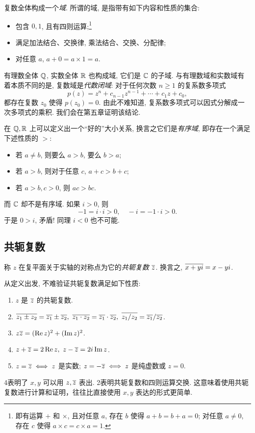 复数全体构成一个\emph{域}.
所谓的域, 是指带有如下内容和性质的集合:
\begin{itemize}
  \item 包含 $0,1$, 且有四则运算;\footnote{即有运算 $+$ 和 $\times$, 且对任意 $a$, 存在 $b$ 使得 $a+b=b+a=0$; 对任意 $a\neq 0$, 存在 $c$ 使得 $a\times c=c\times a=1$.}
  \item 满足加法结合、交换律, 乘法结合、交换、分配律;
  \item 对任意 $a$, $a+0=a\times 1=a$.
\end{itemize}
有理数全体 ${\mathbb{Q}}$, 实数全体 ${\mathbb{R}}$ 也构成域, 它们是 ${\mathbb{C}}$ 的子域.
与有理数域和实数域有着本质不同的是, 复数域是\emph{代数闭域}:
对于任何次数 $n\ge 1$ 的复系数多项式
  \[p(z)=z^n+c_{n-1}z^{n-1}+\cdots+c_1z+c_0,\]
都存在复数 $z_0$ 使得 $p(z_0)=0$.
由此不难知道, 复系数多项式可以因式分解成一次多项式的乘积.
我们会在第五章证明该结论.

在 ${\mathbb{Q}},{\mathbb{R}}$ 上可以定义出一个``好的''大小关系, 换言之它们是\emph{有序域}, 即存在一个满足下述性质的 $>$:
\begin{itemize}
  \item 若 $a\neq b$, 则要么 $a>b$, 要么 $b>a$;
  \item 若 $a>b$, 则对于任意 $c$, $a+c>b+c$;
  \item 若 $a>b,c>0$, 则 $ac>bc$.
\end{itemize}
而 \alert{${\mathbb{C}}$ 却不是有序域}.
如果 $i>0$, 则
  \[-1=i\cdot i>0,\quad -i=-1\cdot i>0.\]
于是 $0>i$, 矛盾! 同理 $i<0$ 也不可能.


\subsection{共轭复数}

\begin{definition}[共轭复数]
  称 $z$ 在复平面关于实轴的对称点为它的\emph{共轭复数 $\overline z$}.
换言之, $\overline{x+yi}=x-yi$.
\end{definition}
从定义出发, 不难验证共轭复数满足如下性质:
\begin{enumerate}
  \item $z$ 是 $\overline z$ 的共轭复数.
  \item $\ov{z_1\pm z_2}=\ov{z_1}\pm\ov{z_2},\ 
  \ov{z_1\cdot z_2}=\ov{z_1}\cdot\ov{z_2},\ 
  \ov{z_1/z_2}=\ov{z_1}/\ov{z_2}$.
  \item $z\overline{z}=(\operatorname{Re} z)^2+(\operatorname{Im} z)^2$.
  \item $z+\overline z=2\operatorname{Re} z,\ z-\overline z=2i\operatorname{Im} z$.
  \item $z=\overline z\iff z$ 是实数; $z=-\overline z\iff z$ 是纯虚数或 $z=0$.
\end{enumerate}
\enumnum4表明了 $x,y$ 可以用 $z,\overline z$ 表出.
\enumnum2表明共轭复数和四则运算交换.
这意味着使用共轭复数进行计算和证明，往往比直接使用 $x,y$ 表达的形式更简单.

